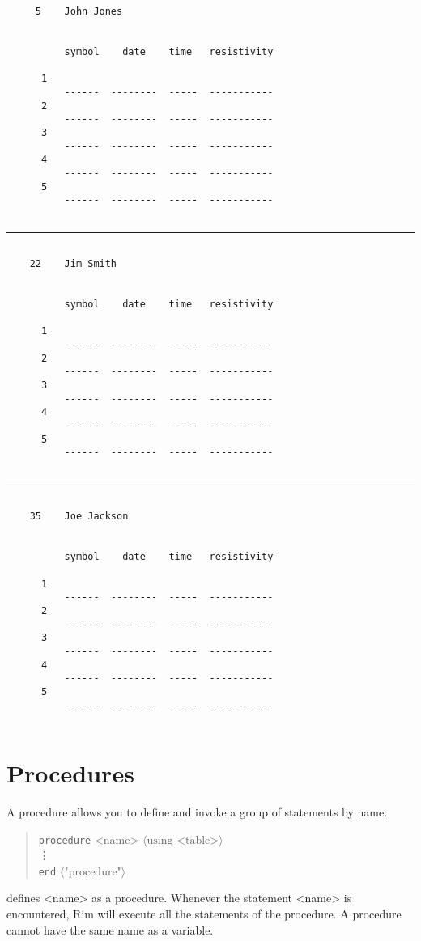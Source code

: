 \documentclass[11pt,a4paper]{report}
\def\opt#1{$\langle \mbox{#1} \rangle$}
\def\I{\index}
\begin{document}
\begin{verbatim}
     5    John Jones
 
 
          symbol    date    time   resistivity
 
      1
          ------  --------  -----  -----------
      2
          ------  --------  -----  -----------
      3
          ------  --------  -----  -----------
      4
          ------  --------  -----  -----------
      5
          ------  --------  -----  -----------
 
\end{verbatim}
\hrule
\begin{verbatim}
 
    22    Jim Smith
 
 
          symbol    date    time   resistivity
 
      1
          ------  --------  -----  -----------
      2
          ------  --------  -----  -----------
      3
          ------  --------  -----  -----------
      4
          ------  --------  -----  -----------
      5
          ------  --------  -----  -----------
 
\end{verbatim}
\hrule
\begin{verbatim}
 
    35    Joe Jackson
 
 
          symbol    date    time   resistivity
 
      1
          ------  --------  -----  -----------
      2
          ------  --------  -----  -----------
      3
          ------  --------  -----  -----------
      4
          ------  --------  -----  -----------
      5
          ------  --------  -----  -----------
 
\end{verbatim}
 
\section{Procedures}
%
\I{procedures}
A procedure allows you to define and
invoke a group of statements by name.
\begin{verse}
  \verb!procedure! <name> \opt{using <table>}\\
  \qquad\vdots\\
  \verb!end! \opt{"procedure"}
\end{verse}
defines <name> as a procedure.  Whenever the statement
<name>
is encountered, Rim will execute all the statements of the
procedure.
A procedure cannot have the same name as a variable.
 
\end{document}
